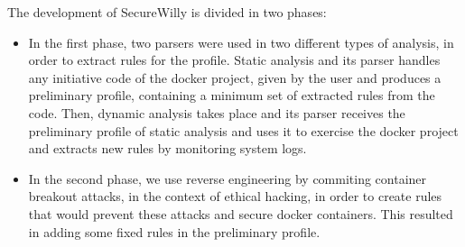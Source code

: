 The development of SecureWilly is divided in two phases:
\begin{itemize}
\item In the first phase, two parsers were used in two different types of analysis, in order to extract rules for the profile. Static analysis and its parser handles any initiative code of the docker project, given by the user and produces a preliminary profile, containing a minimum set of extracted rules from the code. Then, dynamic analysis takes place and its parser receives the preliminary profile of static analysis and uses it to exercise the docker project and extracts new rules by monitoring system logs.
\item In the second phase, we use reverse engineering by commiting container breakout attacks, in the context of ethical hacking, in order to create rules that would prevent these attacks and secure docker containers. This resulted in adding some fixed rules in the preliminary profile.
\end{itemize}


